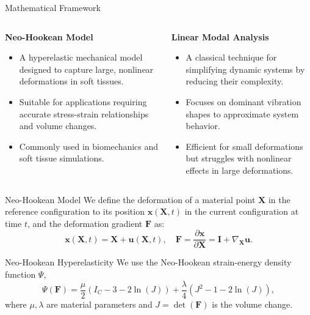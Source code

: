 \documentclass{beamer}
\begin{document}
\begin{frame}{Mathematical Framework}
    \begin{columns}[T]
        \begin{column}{0.5\textwidth}
            \textbf{Neo-Hookean Model}
            \begin{itemize}
                \item A hyperelastic mechanical model designed to capture large, nonlinear deformations in soft tissues.
                \item Suitable for applications requiring accurate stress-strain relationships and volume changes.
                \item Commonly used in biomechanics and soft tissue simulations.
            \end{itemize}
        \end{column}
        
        \begin{column}{0.5\textwidth}
            \textbf{Linear Modal Analysis}
            \begin{itemize}
                \item A classical technique for simplifying dynamic systems by reducing their complexity.
                \item Focuses on dominant vibration shapes to approximate system behavior.
                \item Efficient for small deformations but struggles with nonlinear effects in large deformations.
            \end{itemize}
        \end{column}
    \end{columns}
\end{frame}

\begin{frame}{Neo-Hookean Model}
    We define the deformation of a material point \(\bm{X}\) in the reference configuration to its position \(\bm{x}(\bm{X},t)\) in the current configuration at time \(t\), and the deformation gradient \(\bm{F}\) as:
    \begin{equation}
        \bm{x}(\bm{X},t) = \bm{X} + \bm{u}(\bm{X},t), \quad \bm{F} = \frac{\partial \bm{x}}{\partial \bm{X}} = \bm{I} + \nabla_{\mathbf{X}} \bm{u}.
    \end{equation}
    
    \begin{block}{Neo-Hookean Hyperelasticity}
        We use the Neo-Hookean strain-energy density function $\Psi$,
        \begin{equation}
            \Psi(\bm{F}) = \frac{\mu}{2} (I_C - 3 - 2\ln(J)) + \frac{\lambda}{4} (J^2 - 1 - 2\ln(J)),
        \end{equation}
        where \(\mu, \lambda\) are material parameters and \(J = \det(\bm{F})\) is the volume change.
    \end{block}
\end{frame}
\end{document}
